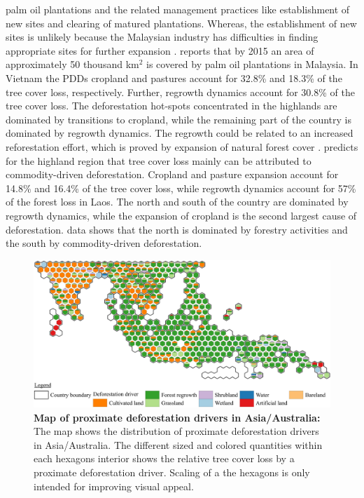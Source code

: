 palm oil plantations and the related management practices like establishment of new sites and clearing of matured plantations. Whereas, the establishment of new sites is unlikely because the Malaysian industry has difficulties in finding appropriate sites for further expansion \citep{Corley2016}. \citeauthor{Corley2016} reports that by 2015 an area of approximately 50 thousand km$^2$ is covered by palm oil plantations in Malaysia. In Vietnam the \acp{PDD} cropland and pastures account for 32.8\% and 18.3\% of the tree cover loss, respectively. Further, regrowth dynamics account for 30.8\% of the tree cover loss. The deforestation hot-spots concentrated in the highlands are dominated by transitions to cropland, while the remaining part of the country is dominated by regrowth dynamics. The regrowth could be related to an increased reforestation effort, which is proved by expansion of natural forest cover \citep{Chazdon2008}. \citet{Curtis2018} predicts for the highland region that tree cover loss mainly can be attributed to commodity-driven deforestation. Cropland and pasture expansion account for 14.8\% and 16.4\% of the tree cover loss, while regrowth dynamics account for 57\% of the forest loss in Laos. The north and south of the country are dominated by regrowth dynamics, while the expansion of cropland is the second largest cause of deforestation. \citet{Curtis2018} data shows that the north is dominated by forestry activities and the south by commodity-driven deforestation.
			\begin{figure}[ht]
				\centering
				\includegraphics[scale=1]{img/asia_driver_frameless}
				\caption[Map of proximate deforestation drivers in Asia/Australia]{\textbf{Map of proximate deforestation drivers in Asia/Australia:} The map shows the distribution of proximate deforestation drivers in Asia/Australia. The different sized and colored quantities within each hexagons interior shows the relative tree cover loss by a proximate deforestation driver. Scaling of a the hexagons is only intended for improving visual appeal.}
				\label{fig:asia_driver}
			\end{figure}

